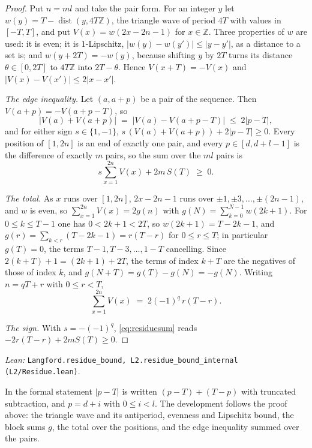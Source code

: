 \documentclass[11pt]{amsart}
\theoremstyle{plain}
\theoremstyle{definition}
\theoremstyle{remark}
\newcommand{\Z}{\mathbb{Z}}
\newcommand{\lean}[1]{\par\smallskip
  {\small\raggedright\noindent\textit{Lean:} \texttt{#1}.\par}\smallskip}
\begin{document}
\begin{proof}
Put $n = ml$ and take the pair form. For an integer $y$ let
$w(y) = T - \operatorname{dist}(y, 4T\Z)$, the triangle wave of period $4T$ with values
in $[-T,T]$, and put $V(x) = w(2x - 2n - 1)$ for $x \in \Z$. Three properties of $w$ are
used: it is even; it is $1$-Lipschitz, $|w(y) - w(y')| \le |y - y'|$, as a distance to a
set is; and $w(y + 2T) = -w(y)$, because shifting $y$ by $2T$ turns its distance
$\theta \in [0,2T]$ to $4T\Z$ into $2T - \theta$. Hence $V(x + T) = -V(x)$ and
$|V(x) - V(x')| \le 2|x - x'|$.

\emph{The edge inequality.} Let $(a, a+p)$ be a pair of the sequence. Then
$V(a+p) = -V(a+p-T)$, so
\[
  |V(a) + V(a+p)| \;=\; |V(a) - V(a+p-T)| \;\le\; 2|p - T|,
\]
and for either sign $s \in \{1,-1\}$, $s\,(V(a) + V(a+p)) + 2|p - T| \ge 0$.
Every position of $[1,2n]$ is an end of exactly one pair, and every $p \in [d,d+l-1]$ is
the difference of exactly $m$ pairs, so the sum over the $ml$ pairs is
\begin{equation}\label{eq:residuesum}
  s \sum_{x=1}^{2n} V(x) + 2m\,S(T) \;\ge\; 0 .
\end{equation}

\emph{The total.} As $x$ runs over $[1,2n]$, $2x - 2n - 1$ runs over
$\pm 1, \pm 3, \dots, \pm(2n-1)$, and $w$ is even, so $\sum_{x=1}^{2n} V(x) = 2g(n)$ with
$g(N) = \sum_{k=0}^{N-1} w(2k+1)$. For $0 \le k \le T-1$ one has $0 < 2k+1 < 2T$, so
$w(2k+1) = T - 2k - 1$, and $g(r) = \sum_{k<r} (T - 2k - 1) = r(T-r)$ for
$0 \le r \le T$; in particular $g(T) = 0$, the terms $T-1, T-3, \dots, 1-T$ cancelling.
Since $2(k+T) + 1 = (2k+1) + 2T$, the terms of index $k + T$ are the negatives of those
of index $k$, and $g(N + T) = g(T) - g(N) = -g(N)$. Writing $n = qT + r$ with
$0 \le r < T$,
\[
  \sum_{x=1}^{2n} V(x) \;=\; 2(-1)^q\, r(T-r).
\]

\emph{The sign.} With $s = -(-1)^q$, \eqref{eq:residuesum} reads
$-2r(T-r) + 2mS(T) \ge 0$.
\end{proof}
\lean{Langford.residue\_bound, L2.residue\_bound\_internal (L2/Residue.lean)}

In the formal statement $|p - T|$ is written $(p - T) + (T - p)$ with truncated
subtraction, and $p = d + i$ with $0 \le i < l$. The development follows the proof above:
the triangle wave and its antiperiod, evenness and Lipschitz bound, the block sums
$g$, the total over the positions, and the edge inequality summed over the pairs.
\end{document}
